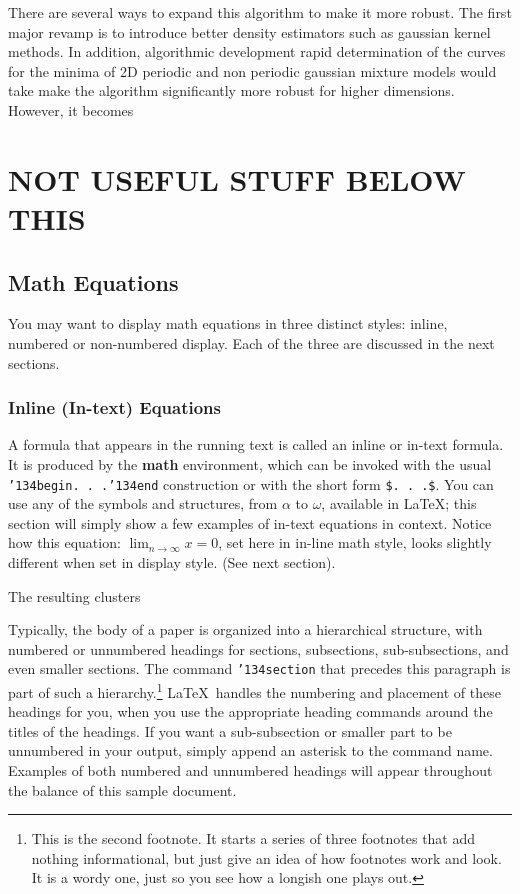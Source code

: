 \documentclass{acm_proc_article-sp}
\begin{document}
There are several ways to expand this algorithm to make it more robust. The first major revamp is to introduce better density estimators such as gaussian kernel methods. In addition, algorithmic development rapid determination of the curves for the minima of 2D periodic and non periodic gaussian mixture models would take make the algorithm significantly more robust for higher dimensions. However, it becomes

\section{NOT USEFUL STUFF BELOW THIS}

\subsection{Math Equations}
You may want to display math equations in three distinct styles:
inline, numbered or non-numbered display.  Each of
the three are discussed in the next sections.

\subsubsection{Inline (In-text) Equations}
A formula that appears in the running text is called an
inline or in-text formula.  It is produced by the
\textbf{math} environment, which can be
invoked with the usual \texttt{{\char'134}begin. . .{\char'134}end}
construction or with the short form \texttt{\$. . .\$}. You
can use any of the symbols and structures,
from $\alpha$ to $\omega$, available in
\LaTeX\cite{Lamport:LaTeX}; this section will simply show a
few examples of in-text equations in context. Notice how
this equation: \begin{math}\lim_{n\rightarrow \infty}x=0\end{math},
set here in in-line math style, looks slightly different when
set in display style.  (See next section).


The resulting clusters 

Typically, the body of a paper is organized
into a hierarchical structure, with numbered or unnumbered
headings for sections, subsections, sub-subsections, and even
smaller sections.  The command \texttt{{\char'134}section} that
precedes this paragraph is part of such a
hierarchy.\footnote{This is the second footnote.  It
starts a series of three footnotes that add nothing
informational, but just give an idea of how footnotes work
and look. It is a wordy one, just so you see
how a longish one plays out.} \LaTeX\ handles the numbering
and placement of these headings for you, when you use
the appropriate heading commands around the titles
of the headings.  If you want a sub-subsection or
smaller part to be unnumbered in your output, simply append an
asterisk to the command name.  Examples of both
numbered and unnumbered headings will appear throughout the
balance of this sample document.
\end{document}
